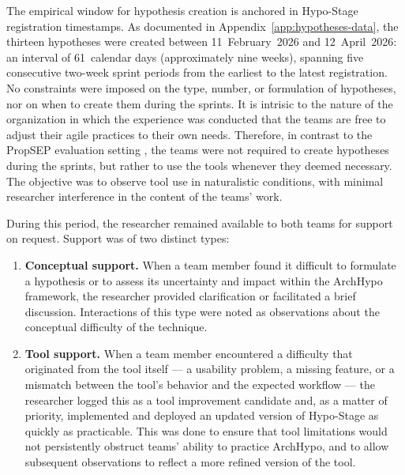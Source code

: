 The empirical window for hypothesis creation is anchored in Hypo-Stage registration timestamps. As documented in Appendix~\ref{app:hypotheses-data}, the thirteen hypotheses were created between 11~February~2026 and 12~April~2026: an interval of 61~calendar days (approximately nine weeks), spanning five consecutive two-week sprint periods from the earliest to the latest registration. No constraints were imposed on the type, number, or
formulation of hypotheses, nor on when to create them during the sprints. It is intrisic to the nature of the organization in which the experience was conducted that the teams are free to adjust their agile practices to their own needs. Therefore, in contrast to the PropSEP evaluation setting \citep{silva2024tse}, the teams were not required to create hypotheses during the sprints, but rather to use the tools whenever they deemed necessary.
The objective was to observe tool use in naturalistic conditions, with minimal researcher interference in the content of the teams' work.

During this period, the researcher remained available to both teams for support on
request. Support was of two distinct types:

\begin{enumerate}
  \item \textbf{Conceptual support.} When a team member found it difficult to
    formulate a hypothesis or to assess its uncertainty and impact within the
    ArchHypo framework, the researcher provided clarification or facilitated a brief
    discussion. Interactions of this type were noted as observations about the
    conceptual difficulty of the technique.

  \item \textbf{Tool support.} When a team member encountered a difficulty that
    originated from the tool itself --- a usability problem, a missing feature, or a
    mismatch between the tool's behavior and the expected workflow --- the researcher
    logged this as a tool improvement candidate and, as a matter of priority,
    implemented and deployed an updated version of Hypo-Stage as quickly as
    practicable. This was done to ensure that tool limitations would not persistently
    obstruct teams' ability to practice ArchHypo, and to allow subsequent
    observations to reflect a more refined version of the tool.
\end{enumerate}

